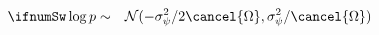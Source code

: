 \begin{eqnarray}
\ifnumSw \log {p} & \sim & \mathcal{N}(-\sigma_{\psi}^{2}/2 \cancel{\Omega},\sigma_{\psi}^{2}/\cancel{\Omega})
\end{eqnarray}
